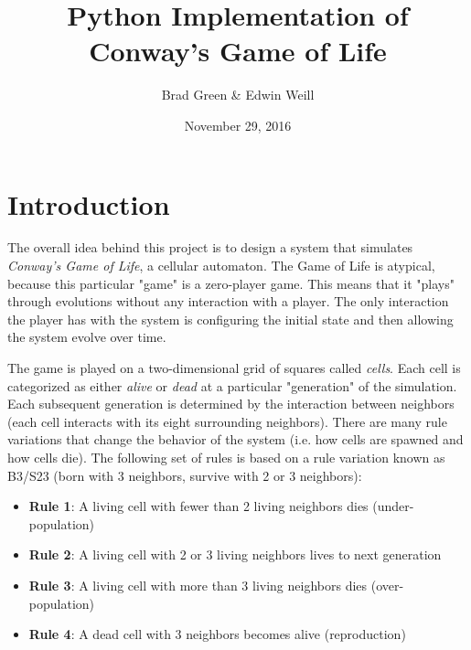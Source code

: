 \documentclass[11pt]{article}
\title{Python Implementation of Conway's Game of Life}
\author{Brad Green \& Edwin Weill}
\date{November 29, 2016}
\begin{document}
\maketitle

\section{Introduction}
The overall idea behind this project is to design a system that simulates \textit{Conway's Game of Life}\cite{conway}, a cellular automaton.  The Game of Life is atypical, because this particular "game" is a zero-player game.  This means that it "plays" through evolutions without any interaction with a player.  The only interaction the player has with the system is configuring the initial state and then allowing the system evolve over time.
\par
The game is played on a two-dimensional grid of squares called \textit{cells}.  Each cell is categorized as either \textit{alive} or \textit{dead} at a particular "generation" of the simulation.  Each subsequent generation is determined by the interaction between neighbors (each cell interacts with its eight surrounding neighbors).  There are many rule variations that change the behavior of the system (i.e. how cells are spawned and how cells die).  The following set of rules is based on a rule variation known as B3/S23 (born with 3 neighbors, survive with 2 or 3 neighbors):
\begin{itemize}
	\item \textbf{Rule 1}: A living cell with fewer than 2 living neighbors dies (under-population)
	\item \textbf{Rule 2}: A living cell with 2 or 3 living neighbors lives to next generation
	\item \textbf{Rule 3}: A living cell with more than 3 living neighbors dies (over-population)
	\item \textbf{Rule 4}: A dead cell with 3 neighbors becomes alive (reproduction)
\end{itemize}
\end{document}
